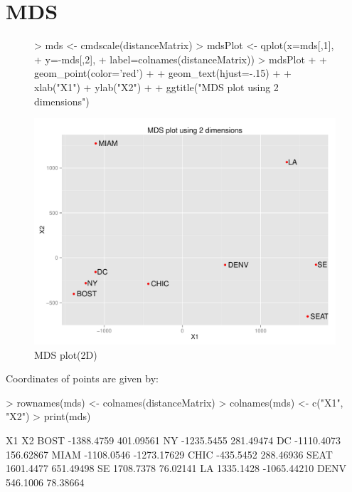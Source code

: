 \documentclass{article}
\begin{document}
\section{MDS}
\begin{figure}

\begin{Schunk}
\begin{Sinput}
> mds <- cmdscale(distanceMatrix)
> mdsPlot  <- qplot(x=mds[,1], 
+                   y=-mds[,2], 
+                   label=colnames(distanceMatrix)) 
> mdsPlot + 
+   geom_point(color='red') + 
+   geom_text(hjust=-.15) + 
+   xlab("X1") + ylab("X2") + 
+   ggtitle("MDS plot using 2 dimensions")
\end{Sinput}
\end{Schunk}
\includegraphics{hw3_saket-003}
\caption{MDS plot(2D)}
\end{figure}

Coordinates of points are given by:
\begin{Schunk}
\begin{Sinput}
> rownames(mds) <- colnames(distanceMatrix)
> colnames(mds) <- c("X1", "X2")
> print(mds)
\end{Sinput}
\begin{Soutput}
             X1          X2
BOST -1388.4759   401.09561
NY   -1235.5455   281.49474
DC   -1110.4073   156.62867
MIAM -1108.0546 -1273.17629
CHIC  -435.5452   288.46936
SEAT  1601.4477   651.49498
SE    1708.7378    76.02141
LA    1335.1428 -1065.44210
DENV   546.1006    78.38664
\end{Soutput}
\end{Schunk}
\end{document}
